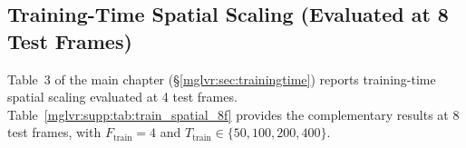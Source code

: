 \subsection{Training-Time Spatial Scaling (Evaluated at 8 Test Frames)}
\label{mglvr:supp:sec:train_spatial_8f}

Table~3 of the main chapter (\S\ref{mglvr:sec:trainingtime}) reports training-time spatial scaling evaluated at 4 test frames. Table~\ref{mglvr:supp:tab:train_spatial_8f} provides the complementary results at 8 test frames, with $F_{\text{train}}=4$ and $T_{\text{train}} \in \{50, 100, 200, 400\}$.


